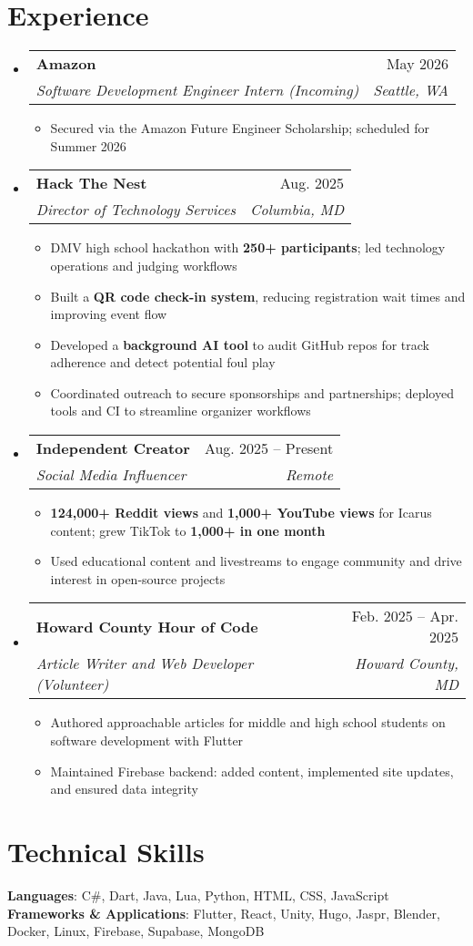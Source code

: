 \documentclass[letterpaper,11pt]{article}
\makeatletter
\newcommand{\resumeItem}[1]{
  \item\small{
    {#1 \vspace{-2pt}}
  }
}
\newcommand{\resumeSubheading}[4]{
  \vspace{-2pt}\item
    \begin{tabular*}{0.97\textwidth}[t]{l@{\extracolsep{\fill}}r}
      \textbf{#1} & #2 \\
      \textit{\small#3} & \textit{\small #4} \\
    \end{tabular*}\vspace{-7pt}
}
\newcommand{\resumeSubHeadingListStart}{\begin{itemize}[leftmargin=0.15in, label={}]}
\newcommand{\resumeSubHeadingListEnd}{\end{itemize}}
\newcommand{\resumeItemListStart}{\begin{itemize}}
\newcommand{\resumeItemListEnd}{\end{itemize}\vspace{-5pt}}
\makeatother
\begin{document}
\section{Experience}
  \resumeSubHeadingListStart

    \resumeSubheading
      {Amazon}{May 2026}
      {Software Development Engineer Intern (Incoming)}{Seattle, WA}
      \resumeItemListStart
        \resumeItem{Secured via the Amazon Future Engineer Scholarship; scheduled for Summer 2026}
      \resumeItemListEnd

    \resumeSubheading
      {Hack The Nest}{Aug. 2025}
      {Director of Technology Services}{Columbia, MD}
      \resumeItemListStart
        \resumeItem{DMV high school hackathon with \textbf{250+ participants}; led technology operations and judging workflows}
        \resumeItem{Built a \textbf{QR code check-in system}, reducing registration wait times and improving event flow}
        \resumeItem{Developed a \textbf{background AI tool} to audit GitHub repos for track adherence and detect potential foul play}
        \resumeItem{Coordinated outreach to secure sponsorships and partnerships; deployed tools and CI to streamline organizer workflows}
      \resumeItemListEnd

    \resumeSubheading
      {Independent Creator}{Aug. 2025 -- Present}
      {Social Media Influencer}{Remote}
      \resumeItemListStart
        \resumeItem{\textbf{124,000+ Reddit views} and \textbf{1,000+ YouTube views} for Icarus content; grew TikTok to \textbf{1,000+ in one month}}
        \resumeItem{Used educational content and livestreams to engage community and drive interest in open-source projects}
      \resumeItemListEnd

    \resumeSubheading
      {Howard County Hour of Code}{Feb. 2025 -- Apr. 2025}
      {Article Writer and Web Developer (Volunteer)}{Howard County, MD}
      \resumeItemListStart
        \resumeItem{Authored approachable articles for middle and high school students on software development with Flutter}
        \resumeItem{Maintained Firebase backend: added content, implemented site updates, and ensured data integrity}
      \resumeItemListEnd

  \resumeSubHeadingListEnd

\section{Technical Skills}
\begin{itemize}[leftmargin=0.15in, label={}]
  \small{\item{
    \textbf{Languages}{: C\#, Dart, Java, Lua, Python, HTML, CSS, JavaScript} \\
    \textbf{Frameworks \& Applications}{: Flutter, React, Unity, Hugo, Jaspr, Blender, Docker, Linux, Firebase, Supabase, MongoDB} \\
  }}
\end{itemize}
\end{document}
